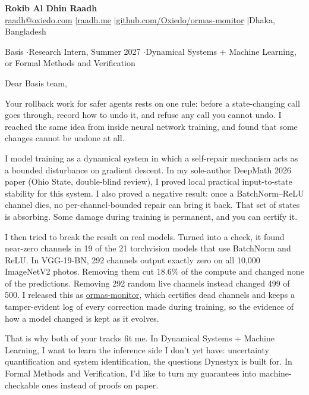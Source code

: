 \documentclass[10pt,a4paper]{article}
\begin{document}
\RaggedRight
\color{body}
\setlength{\parskip}{7pt}
{\large\bfseries\color{heading} Rokib Al Dhin Raadh}\\[1pt]
{\footnotesize \href{mailto:raadh@oxiedo.com}{raadh@oxiedo.com} \enspace$|$\enspace \href{https://www.raadh.me}{raadh.me} \enspace$|$\enspace \href{https://github.com/Oxiedo/ormas-monitor}{github.com/Oxiedo/ormas-monitor} \enspace$|$\enspace Dhaka, Bangladesh}

\vspace{6pt}
{\small Basis \enspace$\cdot$\enspace Research Intern, Summer 2027 \enspace$\cdot$\enspace Dynamical Systems + Machine Learning, or Formal Methods and Verification}

\vspace{4pt}
Dear Basis team,

Your rollback work for safer agents rests on one rule: before a state-changing call goes through, record how to undo it, and refuse any call you cannot undo. I reached the same idea from inside neural network training, and found that some changes cannot be undone at all.

I model training as a dynamical system in which a self-repair mechanism acts as a bounded disturbance on gradient descent. In my sole-author DeepMath 2026 paper (Ohio State, double-blind review), I proved local practical input-to-state stability for this system. I also proved a negative result: once a BatchNorm--ReLU channel dies, no per-channel-bounded repair can bring it back. That set of states is absorbing. Some damage during training is permanent, and you can certify it.

I then tried to break the result on real models. Turned into a check, it found near-zero channels in 19 of the 21 torchvision models that use BatchNorm and ReLU. In VGG-19-BN, 292 channels output exactly zero on all 10,000 ImageNetV2 photos. Removing them cut 18.6\% of the compute and changed none of the predictions. Removing 292 random live channels instead changed 499 of 500. I released this as \href{https://pypi.org/project/ormas-monitor/}{ormas-monitor}, which certifies dead channels and keeps a tamper-evident log of every correction made during training, so the evidence of how a model changed is kept as it evolves.

That is why both of your tracks fit me. In Dynamical Systems + Machine Learning, I want to learn the inference side I don't yet have: uncertainty quantification and system identification, the questions Dynestyx is built for. In Formal Methods and Verification, I'd like to turn my guarantees into machine-checkable ones instead of proofs on paper.
\end{document}
